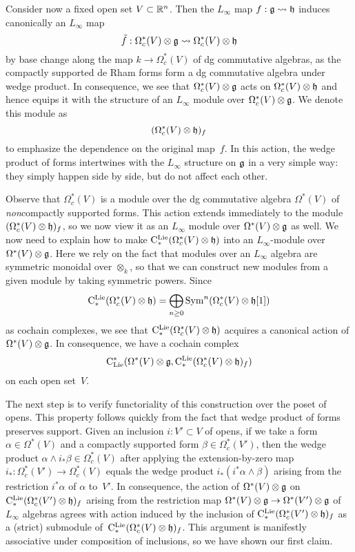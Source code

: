 \documentclass[11pt]{amsart}
\numberwithin{equation}{section}
\begin{document}
Consider now a fixed open set $V \subset \mathbb R^n$.
Then the $L_\infty$ map $f: \mathfrak g \rightsquigarrow \mathfrak h$ induces canonically an $L_\infty$ map 
\[
\tilde{f}: \Omega^*_c(V) \otimes \mathfrak g \rightsquigarrow \Omega^*_c(V) \otimes \mathfrak h
\]
by base change along the map $k \to \Omega^*_c(V)$ of dg commutative algebras,
as the compactly supported de Rham forms form a dg commutative algebra under wedge product.
In consequence, we see that $\Omega^*_c(V) \otimes \mathfrak g$ acts on $\Omega^*_c(V) \otimes \mathfrak h$ and hence equips it with the structure of an $L_\infty$ module over $\Omega^*_c(V) \otimes \mathfrak g$.
We denote this module as
\[
(\Omega^*_c(V) \otimes \mathfrak h)_f
\]
to emphasize the dependence on the original map~$f$.
In this action, the wedge product of forms intertwines with the $L_\infty$ structure on $\mathfrak g$ in a very simple way: 
they simply happen side by side, but do not affect each other.

Observe that $\Omega^*_c(V)$ is a module over the dg commutative algebra $\Omega^*(V)$ of {\em non}\/compactly supported forms.
This action extends immediately to the module $(\Omega^*_c(V) \otimes \mathfrak h)_f$, 
so we now view it as an $L_\infty$ module over $\Omega^*(V) \otimes \mathfrak g$ as well.
We now need to explain how to make ${\rm C}^{\rm Lie}_*(\Omega^*_c(V) \otimes \mathfrak h)$ into an $L_\infty$-module over $\Omega^*(V) \otimes \mathfrak g$.
Here we rely on the fact that modules over an $L_\infty$ algebra are symmetric monoidal over $\otimes_k$, 
so that we can construct new modules from a given module by taking symmetric powers.
Since
\[
{\rm C}^{\rm Lie}_*(\Omega^*_c(V) \otimes \mathfrak h) = \bigoplus_{n \geq 0} {\rm Sym}^n(\Omega^*_c(V) \otimes \mathfrak h[1])
\]
as cochain complexes,
we see that ${\rm C}^{\rm Lie}_*(\Omega^*_c(V) \otimes \mathfrak h)$ acquires a canonical action of $\Omega^*(V) \otimes \mathfrak g$.
In consequence, we have a cochain complex
\[
{\rm C}_{\rm Lie}^*(\Omega^*(V) \otimes \mathfrak g, {\rm C}^{\rm Lie}_*(\Omega^*_c(V) \otimes \mathfrak h)_f)
\]
on each open set~$V$.

The next step is to verify functoriality of this construction over the poset of opens.
This property follows quickly from the fact that wedge product of forms preserves support.
Given an inclusion $i: V' \subset V$ of opens, if we take a form $\alpha \in \Omega^*(V)$ and a compactly supported form $\beta \in \Omega^*_c(V')$, then the wedge product $\alpha \wedge i_* \beta \in \Omega^*_c(V)$ after applying the extension-by-zero map $i_*: \Omega^*_c(V') \to \Omega^*_c(V)$ equals the wedge product $i_*(i^*\alpha \wedge \beta)$ arising from the restriction $i^* \alpha$ of $\alpha$ to~$V'$.
In consequence, the action of $\Omega^*(V) \otimes \mathfrak g$ on ${\rm C}^{\rm Lie}_*(\Omega^*_c(V') \otimes \mathfrak h)_f$ arising from the restriction map $\Omega^*(V) \otimes \mathfrak g \to \Omega^*(V') \otimes \mathfrak g$ of $L_\infty$ algebras agrees with action induced by the inclusion of ${\rm C}^{\rm Lie}_*(\Omega^*_c(V') \otimes \mathfrak h)_f$ as a (strict) submodule of~${\rm C}^{\rm Lie}_*(\Omega^*_c(V) \otimes \mathfrak h)_f$.
This argument is manifestly associative under composition of inclusions, so we have shown our first claim.
\end{document}
